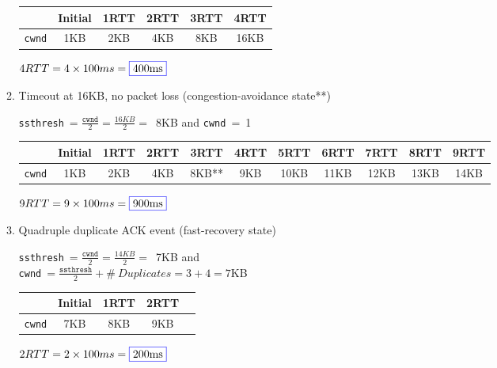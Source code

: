 \documentclass{article}
\begin{document}
\begin{enumerate}
\begin{enumerate}
            \begin{table}[ht]
            \centering
            \begin{tabular}[t]{lccccc}
            \toprule
            & Initial & 1RTT & 2RTT & 3RTT & 4RTT\\ [1ex]
            \midrule
            \texttt{cwnd} & 1KB & 2KB & 4KB & 8KB & 16KB\\[1ex]
            \bottomrule
            \end{tabular}
            \end{table}\par
            $4RTT=4\times 100ms=\fcolorbox{blue}{white}{400ms}$
        \item Timeout at 16KB, no packet loss (congestion-avoidance state**)\par\vspace{0.25cm}
            \texttt{ssthresh}$\ =\frac{\texttt{cwnd}}{2}=\frac{16KB}{2}=$\ 8KB and \texttt{cwnd}\ =\ 1\par\vspace{0.25cm}
            \begin{table}[ht]
            \centering
            \begin{tabular}[t]{lcccccccccc}
            \toprule
            & Initial & 1RTT & 2RTT & 3RTT & 4RTT & 5RTT & 6RTT & 7RTT & 8RTT & 9RTT\\ [1ex]
            \midrule
            \texttt{cwnd} & 1KB & 2KB & 4KB & 8KB** & 9KB & 10KB & 11KB & 12KB & 13KB & 14KB\\[1ex]
            \bottomrule
            \end{tabular}
            \end{table}\par
            $9RTT=9\times 100ms=\fcolorbox{blue}{white}{900ms}$\vspace{0.5cm}
        \item Quadruple duplicate ACK event (fast-recovery state)\par\vspace{0.25cm}
            \texttt{ssthresh}$\ =\frac{\texttt{cwnd}}{2}=\frac{14KB}{2}=$\ 7KB and\\[0.5cm]\texttt{cwnd}$\ =\frac{\texttt{ssthresh}}{2}+\# \ Duplicates=3+4=7$KB\par\vspace{0.25cm}
            \begin{table}[ht]
            \centering
            \begin{tabular}[t]{lcccc}
            \toprule
            & Initial & 1RTT & 2RTT\\ [1ex]
            \midrule
            \texttt{cwnd} & 7KB & 8KB & 9KB\\[1ex]
            \bottomrule
            \end{tabular}
            \end{table}\par
            $2RTT=2\times 100ms=\fcolorbox{blue}{white}{200ms}$
    \end{enumerate}
\end{enumerate}
\end{document}
